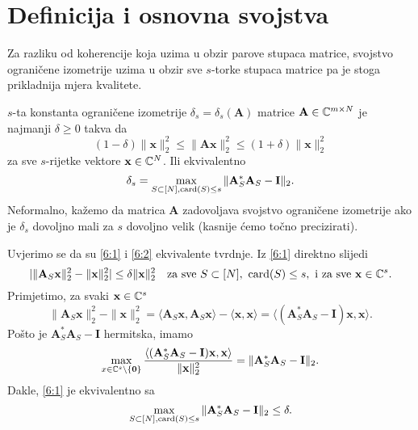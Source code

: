 \documentclass[a4paper,twoside,12pt]{memoir} %
\newcommand{\vect}[1]{\mathbf{#1}}
\renewcommand{\vec}{\vect}
\newcommand{\card}{\text{\normalfont{card}}}
\newcommand{\norm}[1]{\|{#1}\|}
\begin{document}
\section[Definicija i osnovna svojstva][Definicija i osnovna svojstva]{Definicija i osnovna svojstva}
Za razliku od koherencije koja uzima u obzir parove stupaca matrice, svojstvo ograni\v{c}ene izometrije uzima u obzir sve $s$-torke stupaca matrice pa je stoga prikladnija mjera kvalitete.
\begin{defn}\label{defn:6:1}
    $s$-ta konstanta ograni\v{c}ene izometrije $\delta_s = \delta_s(\vec A)$ matrice $\vec A \in \C^{m \times N}$ je najmanji $\delta \geq 0$ takva da
    \begin{equation}\label{6:1}
        (1-\delta) \norm{\vec x}_2^2 \leq \norm{\vec{Ax}}_2^2 \leq (1+\delta)\norm{\vec x}_2^2 
    \end{equation}
    za sve $s$-rijetke vektore $\vec x \in \C^N$. Ili ekvivalentno
    \begin{equation}\label{6:2}
        \delta_s = \max_{S \subset [N], \card(S) \leq s} \norm{\vec A^*_S \vec A_S - \vec I}_2.
    \end{equation}
    Neformalno, ka\v{z}emo da matrica $\vec A$ zadovoljava svojstvo ograni\v{c}ene izometrije ako je $\delta_s$ dovoljno mali za $s$ dovoljno velik (kasnije \'cemo to\v{c}no precizirati).
\end{defn}
Uvjerimo se da su \eqref{6:1} i \eqref{6:2} ekvivalente tvrdnje. Iz \eqref{6:1} direktno slijedi
\begin{equation*}
    | \norm{\vec A_S \vec x}_2^2 - \norm{\vec x}_2^2| \leq \delta \norm{\vec x}_2^2 \quad \text{za sve } S \subset [N],\ \card(S) \leq s,\ \text{i za sve } \vec x \in \C^s.
\end{equation*}
Primjetimo, za svaki $\vec x \in \C^s$
\begin{equation*}
    \norm{\vec A_S \vec x}_2^2 - \norm{\vec x}_2^2 = \langle \vec A_S \vec x, \vec A_S \vec x \rangle - \langle \vec x, \vec x \rangle = \langle (\vec A_S^* \vec A_S - \vec I )\vec x, \vec x\rangle.
\end{equation*}
Po\v{s}to je $\vec A_S^* \vec A_S - \vec I$ hermitska, imamo
\begin{equation*}
    \max_{x \in \C^s \backslash \{\vec 0\}} \frac{\langle (\vec A_S^* \vec A_S - \vec I)\vec x, \vec x \rangle}{\norm{\vec x}_2^2} = \norm{\vec A_S^* \vec A_S - \vec I}_2.
\end{equation*}
Dakle, \eqref{6:1} je ekvivalentno sa
\begin{equation*}
    \max_{S \subset [N], \card(S) \leq s} \norm{\vec A^*_S \vec A_S - \vec I}_2 \leq \delta. 
\end{equation*}
\end{document}
